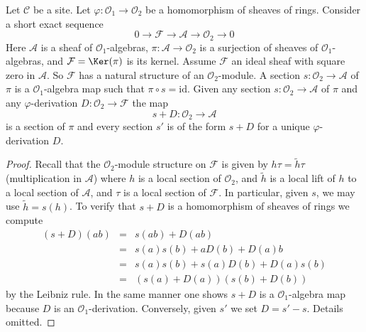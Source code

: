\begin{lemma}
\label{lemma-double-structure-gives-derivation}
Let $\mathcal{C}$ be a site. Let $\varphi : \mathcal{O}_1 \to \mathcal{O}_2$
be a homomorphism of sheaves of rings.
Consider a short exact sequence
$$
0 \to \mathcal{F} \to \mathcal{A} \to \mathcal{O}_2 \to 0
$$
Here $\mathcal{A}$ is a sheaf of $\mathcal{O}_1$-algebras,
$\pi : \mathcal{A} \to \mathcal{O}_2$ is a surjection
of sheaves of $\mathcal{O}_1$-algebras, and
$\mathcal{F} = \Ker(\pi)$ is its kernel. Assume $\mathcal{F}$ an ideal
sheaf with square zero in $\mathcal{A}$. So $\mathcal{F}$
has a natural structure of an $\mathcal{O}_2$-module.
A section $s : \mathcal{O}_2 \to \mathcal{A}$ of $\pi$
is a $\mathcal{O}_1$-algebra map such that $\pi \circ s = \text{id}$.
Given any section $s : \mathcal{O}_2 \to \mathcal{A}$
of $\pi$ and any $\varphi$-derivation $D : \mathcal{O}_2 \to \mathcal{F}$
the map
$$
s + D : \mathcal{O}_2 \to \mathcal{A}
$$
is a section of $\pi$ and every section $s'$ is of the form $s + D$
for a unique $\varphi$-derivation $D$.
\end{lemma}

\begin{proof}
Recall that the $\mathcal{O}_2$-module structure on $\mathcal{F}$
is given by $h \tau = \tilde h \tau$ (multiplication in $\mathcal{A}$)
where $h$ is a local section of $\mathcal{O}_2$, and
$\tilde h$ is a local lift of $h$ to a local
section of $\mathcal{A}$, and $\tau$ is a local section of $\mathcal{F}$.
In particular, given $s$, we may use $\tilde h = s(h)$.
To verify that $s + D$ is a homomorphism of sheaves of rings we
compute
\begin{eqnarray*}
(s + D)(ab) & = & s(ab) + D(ab) \\
& = & s(a)s(b) + aD(b) + D(a)b \\
& = & s(a) s(b) + s(a)D(b) + D(a)s(b) \\
& = & (s(a) + D(a))(s(b) + D(b))
\end{eqnarray*}
by the Leibniz rule. In the same manner one shows
$s + D$ is a $\mathcal{O}_1$-algebra map because $D$ is
an $\mathcal{O}_1$-derivation. Conversely, given $s'$ we set
$D = s' - s$. Details omitted.
\end{proof}

